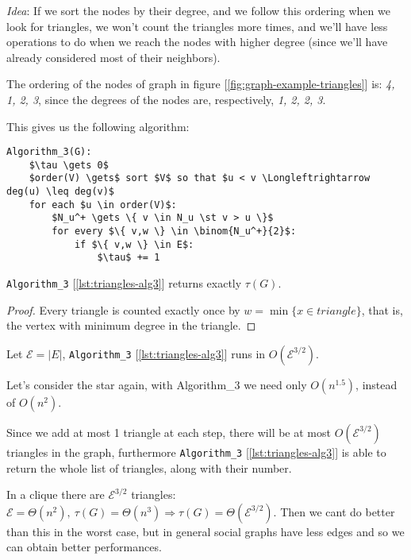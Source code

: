 \textit{Idea}: If we sort the nodes by their degree, and we follow this ordering when we look for triangles, we won't count the triangles more times, and we'll have less operations to do when we reach the nodes with higher degree (since we'll have already considered most of their neighbors).

\begin{ex}
    The ordering of the nodes of graph in figure [\ref{fig:graph-example-triangles}] is: \textit{4, 1, 2, 3}, since the degrees of the nodes are, respectively, \textit{1, 2, 2, 3}.
\end{ex}

This gives us the following algorithm:
\begin{lstlisting}[caption={Algorithm 3}, label={lst:triangles-alg3}]
Algorithm_3(G):
    $\tau \gets 0$
    $order(V) \gets$ sort $V$ so that $u < v \Longleftrightarrow  deg(u) \leq deg(v)$
    for each $u \in order(V)$:
        $N_u^+ \gets \{ v \in N_u \st v > u \}$
        for every $\{ v,w \} \in \binom{N_u^+}{2}$:
            if $\{ v,w \} \in E$:
                $\tau$ += 1
\end{lstlisting}

\begin{thm}\label{thm:triangles-2}
    \texttt{Algorithm\_3} [\ref{lst:triangles-alg3}] returns exactly $\tau(G)$.
\end{thm}
\begin{proof}
    Every triangle is counted exactly once by $w = \min \{ x \in triangle \}$, that is, the vertex with minimum degree in the triangle.
\end{proof}

\begin{thm}\label{thm:triangles-3}
    Let $\mathcal{E} = |E|$, \texttt{Algorithm\_3} [\ref{lst:triangles-alg3}] runs in $O(\mathcal{E}^{3/2})$.
\end{thm}

\ex Let's consider the star again, with Algorithm\_3 we need only $O(n^{1.5})$, instead of $O(n^2)$.

\obs Since we add at most 1 triangle at each step, there will be at most $O(\mathcal{E}^{3/2})$ triangles in the graph, furthermore \texttt{Algorithm\_3} [\ref{lst:triangles-alg3}] is able to return the whole list of triangles, along with their number.

\ex In a clique there are $\mathcal{E}^{3/2}$ triangles: $\mathcal{E} = \Theta(n^2),\ \tau(G) = \Theta(n^3) \Longrightarrow \tau(G) = \Theta(\mathcal{E}^{3/2})$. Then we cant do better than this in the worst case, but in general social graphs have less edges and so we can obtain better performances.

